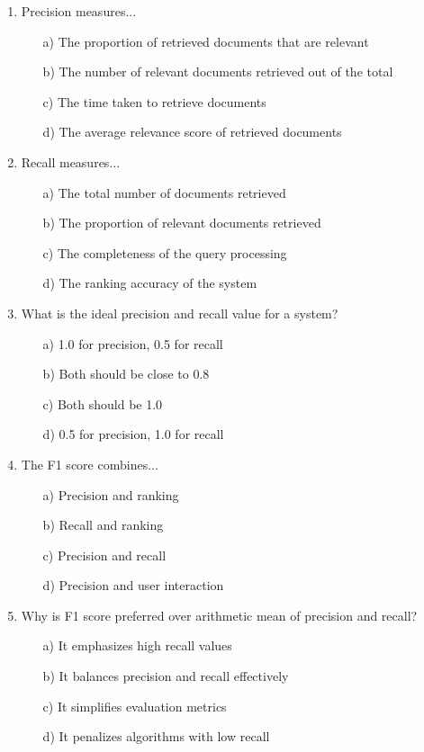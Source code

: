 \documentclass[8pt]{extarticle}
\begin{document}
\begin{multicols}{2}
\begin{enumerate}
\item Precision measures...
\begin{itemize}
\item[a)] The proportion of retrieved documents that are relevant
\item[b)] The number of relevant documents retrieved out of the total
\item[c)] The time taken to retrieve documents
\item[d)] The average relevance score of retrieved documents
\end{itemize}

\item Recall measures...
\begin{itemize}
\item[a)] The total number of documents retrieved
\item[b)] The proportion of relevant documents retrieved
\item[c)] The completeness of the query processing
\item[d)] The ranking accuracy of the system
\end{itemize}

\item What is the ideal precision and recall value for a system?
\begin{itemize}
\item[a)] 1.0 for precision, 0.5 for recall
\item[b)] Both should be close to 0.8
\item[c)] Both should be 1.0
\item[d)] 0.5 for precision, 1.0 for recall
\end{itemize}

\item The F1 score combines...
\begin{itemize}
\item[a)] Precision and ranking
\item[b)] Recall and ranking
\item[c)] Precision and recall
\item[d)] Precision and user interaction
\end{itemize}

\item Why is F1 score preferred over arithmetic mean of precision and recall?
\begin{itemize}
\item[a)] It emphasizes high recall values
\item[b)] It balances precision and recall effectively
\item[c)] It simplifies evaluation metrics
\item[d)] It penalizes algorithms with low recall
\end{itemize}


\end{enumerate}
\end{multicols}
\end{document}
